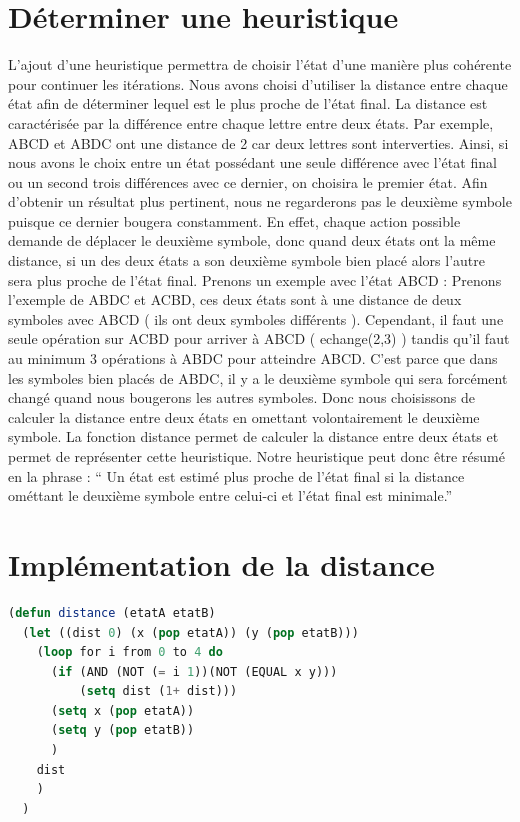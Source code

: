\documentclass[a4paper,10pt]{report}
\begin{document}
  \section{Déterminer une heuristique}
  L’ajout d’une heuristique permettra de choisir l’état d’une manière plus cohérente pour continuer les itérations. Nous avons choisi d’utiliser la distance entre chaque état afin de déterminer lequel est le plus proche de l’état final. La distance est caractérisée par la différence entre chaque lettre entre deux états. Par exemple, ABCD et ABDC ont une distance de 2 car deux lettres sont interverties. 
Ainsi, si nous avons le choix entre un état possédant une seule différence avec l’état final ou un second trois différences avec ce dernier, on choisira le premier état.
Afin d’obtenir un résultat plus pertinent, nous ne regarderons pas le deuxième symbole puisque ce dernier bougera constamment.\newline
En effet, chaque action possible demande de déplacer le deuxième symbole, donc quand deux états ont la même distance, si un des deux états a son deuxième symbole bien placé
alors l'autre sera plus proche de l'état final. Prenons un exemple avec l'état ABCD : \newline
Prenons l'exemple de ABDC et ACBD, ces deux états sont à une distance de deux symboles avec ABCD ( ils ont deux symboles différents ). Cependant, il faut une seule opération
sur ACBD pour arriver à ABCD ( echange(2,3) ) tandis qu'il faut au minimum 3 opérations à ABDC pour atteindre ABCD. C'est parce que dans les symboles bien placés de 
ABDC, il y a le deuxième symbole qui sera forcément changé quand nous bougerons les autres symboles.\newline
Donc nous choisissons de calculer la distance entre deux états en omettant volontairement le deuxième symbole.
La fonction distance permet de calculer la distance entre deux états et permet de représenter cette heuristique.
Notre heuristique peut donc être résumé en la phrase :
`` Un état est estimé plus proche de l'état final si la distance ométtant le deuxième symbole entre celui-ci et l'état final est minimale.''\newpage 
  \section{Implémentation de la distance}

  \begin{lstlisting}[language=Lisp]
   (defun distance (etatA etatB)
  (let ((dist 0) (x (pop etatA)) (y (pop etatB)))
    (loop for i from 0 to 4 do
	  (if (AND (NOT (= i 1))(NOT (EQUAL x y)))
	      (setq dist (1+ dist)))
	  (setq x (pop etatA))
	  (setq y (pop etatB))
	  )
    dist
    )
  )
  \end{lstlisting}
\end{document}
